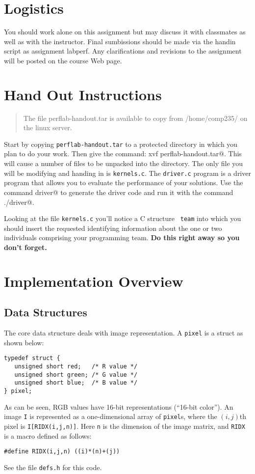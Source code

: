 \documentclass[11pt]{article}
\begin{document}
\section{Logistics}
You should work alone on this assignment but may discuss it with
classmates as well as with the instructor. Final sumbissions should be made
via the handin script as assignment labperf.
Any clarifications and revisions to the assignment will be posted on
the course Web page.

\section{Hand Out Instructions}

\begin{quote}
The file perflab-handout.tar is available to copy from /home/comp235/ on
the linux server.
\end{quote}

Start by copying \texttt{perflab-handout.tar} to a protected directory
in which you plan to do your work.  Then give the command:
\verb@tar xvf perflab-handout.tar@.  This will cause a number of files
to be unpacked into the directory.  The only file you will be
modifying and handing in is {\tt kernels.c}.  The {\tt driver.c}
program is a driver program that allows you to evaluate the
performance of your solutions. Use the command \verb@make driver@ to
generate the driver code and run it with the command \verb@./driver@.

Looking at the file {\tt kernels.c} you'll notice a C structure {\tt
team} into which you should insert the requested identifying
information about the one or two individuals comprising your
programming team.  {\bf Do this right away so you don't forget.}


\section{Implementation Overview}
\label{sec:overview}
\subsection*{Data Structures}
The core data structure deals with image representation. A {\tt pixel} is
a struct as shown below:
\small{\begin{verbatim}
typedef struct {
   unsigned short red;   /* R value */
   unsigned short green; /* G value */
   unsigned short blue;  /* B value */
} pixel;
\end{verbatim}}
As can be seen, RGB values have 16-bit representations (``16-bit color''). An image {\tt I}
is represented
as a one-dimensional array of {\tt pixel}s, where the $(i,j)$th pixel
is {\tt I[RIDX(i,j,n)]}. Here {\tt n} is the dimension of the image
matrix, and {\tt RIDX} is a macro defined as follows:
\small{\begin{verbatim}
#define RIDX(i,j,n) ((i)*(n)+(j))
\end{verbatim}}
See the file {\tt defs.h} for this code.
\end{document}
